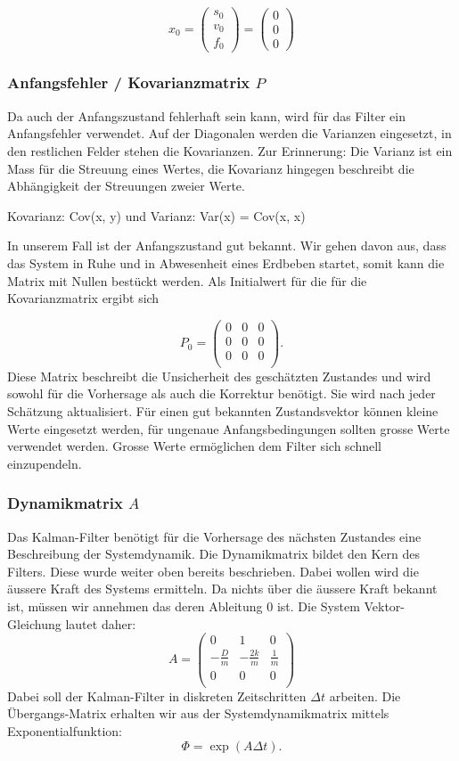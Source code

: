 \[ {x_0 }= \left( \begin{array}{c} {s_0}\\ {v_0}\\{f_0}\end{array}\right) = \left( \begin{array}{c} 0\\ 0\\ 0\end{array}\right) \]

\subsubsection*{Anfangsfehler / Kovarianzmatrix $P$}
Da auch der Anfangszustand fehlerhaft sein kann, wird für das Filter ein Anfangsfehler verwendet. 
Auf der Diagonalen werden die Varianzen eingesetzt, in den restlichen Felder stehen die Kovarianzen.
Zur Erinnerung: Die Varianz ist ein Mass für die Streuung eines Wertes, die Kovarianz hingegen beschreibt die Abhängigkeit der Streuungen zweier Werte.

Kovarianz: Cov(x, y) und Varianz: Var(x) = Cov(x, x)

In unserem Fall ist der Anfangszustand gut bekannt. 
Wir gehen davon aus, dass das System in Ruhe und in Abwesenheit eines Erdbeben startet, somit kann die Matrix mit Nullen bestückt werden. 
Als Initialwert für die für die Kovarianzmatrix ergibt sich

\[ 
{P_0 }=
\left(
\begin{array}{ccc} 	
0 & 0 &0 \\ 
0 &0 & 0 \\ 
0 & 0 &0 \\
\end{array}
\right).
 \] 
Diese Matrix beschreibt die Unsicherheit des geschätzten Zustandes und wird sowohl für die Vorhersage als auch die Korrektur benötigt. 
Sie wird nach jeder Schätzung aktualisiert. 
Für einen gut bekannten Zustandsvektor können kleine Werte eingesetzt werden, für ungenaue Anfangsbedingungen sollten grosse Werte verwendet werden. 
Grosse Werte ermöglichen dem Filter sich schnell einzupendeln. 

\subsubsection*{Dynamikmatrix $A$}
Das Kalman-Filter benötigt für die Vorhersage des nächsten Zustandes eine Beschreibung der Systemdynamik.
Die Dynamikmatrix bildet den Kern des Filters. Diese wurde weiter oben bereits beschrieben. 
Dabei wollen wird die äussere Kraft des Systems ermitteln.
Da nichts über die äussere Kraft bekannt ist, müssen wir annehmen das deren Ableitung 0 ist. 
Die System Vektor-Gleichung lautet daher:
\[ 
A = \left(
 \begin{array}{ccc} 	
0 & 1& 0 \\
- \frac{D}{m} &-\frac{2k}{m} & \frac{1} {m}\\
0 & 0& 0\\ 
\end{array}\right)  
 \]
Dabei soll der Kalman-Filter in diskreten Zeitschritten $\Delta t$ arbeiten. 
Die Übergangs-Matrix erhalten wir aus der Systemdynamikmatrix mittels Exponentialfunktion: 
\[\Phi = \exp(A\Delta t). \]

